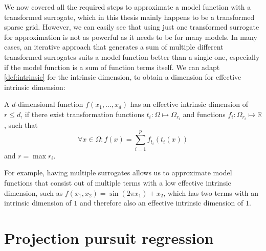 \documentclass[
  a4paper,  %
  twoside,  %
  bibliography=totoc,
  headsepline,
  cleardoublepage=empty,
  parskip=half,
  draft=false
]{scrbook}
\begin{document}
We now covered all the required steps to approximate a model function with a transformed surrogate, which in this thesis mainly happens to be a transformed sparse grid.
However, we can easily see that using just one transformed surrogate for approximation is not as powerful as it needs to be for many models.
In many cases, an iterative approach that generates a sum of multiple different transformed surrogates suits a model function better than a single one, especially if the model function is a sum of function terms itself.
We can adapt \cref{def:intrinsic} for the intrinsic dimension, to obtain a dimension for effective intrinsic dimension:

\begin{definition}
A $d$-dimensional function $f(x_1, \dots, x_d)$ has an effective intrinsic dimension of $r \leq d$, if there exist transformation functions $t_i \colon \Omega \mapsto \Omega_{r_i}$ and functions $f_i \colon \Omega_{r_i} \mapsto \mathds{R}$, such that
\begin{equation}
\forall x \in \Omega \colon f(x)=\sum_{i=1}^p f_{t_i}(t_i(x))
\end{equation}
and $r=\max r_i$.
\label{def:intrinsic_sum}
\end{definition}

For example, having multiple surrogates allows us to approximate model functions that consist out of multiple terms with a low effective intrinsic dimension, such as $f(x_1, x_2)=\sin(2 \pi x_1) + x_2$, which has two terms with an intrinsic dimension of $1$ and therefore also an effective intrinsic dimension of $1$.

\section{Projection pursuit regression}
\end{document}
